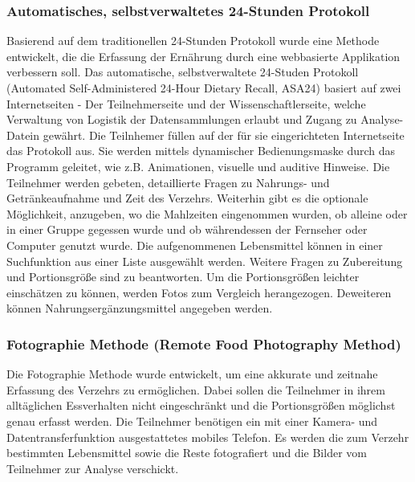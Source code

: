 \subsubsection{Automatisches, selbstverwaltetes 24-Stunden Protokoll}

Basierend auf dem traditionellen 24-Stunden Protokoll wurde eine Methode entwickelt, die die Erfassung der Ernährung durch eine webbasierte Applikation verbessern soll. Das automatische, selbstverwaltete 24-Studen Protokoll (Automated Self-Administered 24-Hour Dietary Recall, ASA24) basiert auf zwei Internetseiten - Der Teilnehmerseite und der Wissenschaftlerseite, welche Verwaltung von Logistik der Datensammlungen erlaubt und  Zugang zu Analyse-Datein gewährt. Die Teilnhemer füllen auf der für sie eingerichteten Internetseite das Protokoll aus. Sie werden mittels dynamischer Bedienungsmaske durch das Programm geleitet, wie z.B. Animationen, visuelle und auditive Hinweise. Die Teilnehmer werden gebeten, detaillierte Fragen zu Nahrungs- und Getränkeaufnahme und Zeit des Verzehrs. Weiterhin gibt es die optionale Möglichkeit, anzugeben, wo die Mahlzeiten eingenommen wurden, ob alleine oder in einer Gruppe gegessen wurde und ob währendessen der Fernseher oder Computer genutzt wurde. 
Die aufgenommenen Lebensmittel können in einer Suchfunktion aus einer Liste ausgewählt werden. Weitere Fragen zu Zubereitung und Portionsgröße sind zu beantworten. Um die Portionsgrößen leichter einschätzen zu können, werden Fotos zum Vergleich herangezogen. Deweiteren können Nahrungsergänzungsmittel angegeben werden.  \cite{asa24} \cite{Subar20121134}





\subsubsection{Fotographie Methode (Remote Food Photography Method)}

Die Fotographie Methode wurde entwickelt, um eine akkurate und zeitnahe Erfassung des Verzehrs zu ermöglichen. Dabei sollen die Teilnehmer in ihrem alltäglichen Essverhalten nicht eingeschränkt und die Portionsgrößen möglichst genau erfasst werden. \cite{5333123}
Die Teilnehmer benötigen ein mit einer Kamera- und Datentransferfunktion ausgestattetes mobiles Telefon. Es werden die zum Verzehr bestimmten Lebensmittel sowie die Reste fotografiert und die Bilder vom Teilnehmer zur Analyse verschickt. \cite{BJN:3324360}




